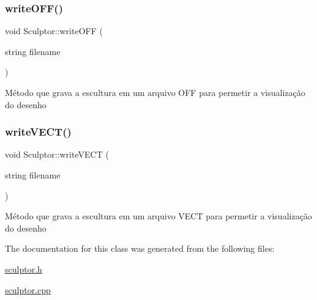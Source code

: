 \subsubsection{\texorpdfstring{writeOFF()}{writeOFF()}}
{\footnotesize\ttfamily void Sculptor\+::write\+O\+FF (\begin{DoxyParamCaption}\item[{string}]{filename }\end{DoxyParamCaption})}

Método que grava a escultura em um arquivo O\+FF para permetir a visualização do desenho \mbox{\label{classSculptor_a200442de17ed45b7a1ece728145a2ddf}} 
\subsubsection{\texorpdfstring{writeVECT()}{writeVECT()}}
{\footnotesize\ttfamily void Sculptor\+::write\+V\+E\+CT (\begin{DoxyParamCaption}\item[{string}]{filename }\end{DoxyParamCaption})}

Método que grava a escultura em um arquivo V\+E\+CT para permetir a visualização do desenho 

The documentation for this class was generated from the following files\+:\begin{DoxyCompactItemize}
\item 
\mbox{\hyperlink{sculptor_8h}{sculptor.\+h}}\item 
\mbox{\hyperlink{sculptor_8cpp}{sculptor.\+cpp}}\end{DoxyCompactItemize}
